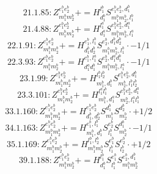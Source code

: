\documentclass[letterpaper,10pt,fleqn,leqno,onecolumn]{article}
\begin{document}
\begin{equation} \;\;\;\;\;\;  21.1.85: Z^{e_{1}^{b}e_{2}^{b}}_{m_{1}^{b}m_{2}^{b}}+=H^{l_{1}^{b}}_{d_{1}^{b}}S^{e_{1}^{b}e_{2}^{b},d_{1}^{b}}_{m_{1}^{b}m_{2}^{b},l_{1}^{b}} \end{equation}
\begin{equation} \;\;\;\;\;\;  21.4.88: Z^{e_{1}^{b}e_{2}^{b}}_{m_{1}^{b}m_{2}^{b}}+=H^{l_{1}^{a}}_{d_{1}^{a}}S^{e_{1}^{b}e_{2}^{b},d_{1}^{a}}_{m_{1}^{b}m_{2}^{b},l_{1}^{a}} \end{equation}
\begin{equation} \;\;\;\;\;\;  22.1.91: Z^{e_{1}^{b}e_{2}^{b}}_{m_{1}^{b}m_{2}^{b}}+=H^{e_{1}^{b},l_{1}^{b}}_{d_{1}^{b}d_{2}^{b}}S^{e_{2}^{b},d_{1}^{b}d_{2}^{b}}_{m_{1}^{b}m_{2}^{b},l_{1}^{b}}\cdot -1/1 \end{equation}
\begin{equation} \;\;\;\;\;\;  22.3.93: Z^{e_{1}^{b}e_{2}^{b}}_{m_{1}^{b}m_{2}^{b}}+=H^{e_{1}^{b},l_{1}^{a}}_{d_{1}^{a}d_{1}^{b}}S^{e_{2}^{b},d_{1}^{a}d_{1}^{b}}_{m_{1}^{b}m_{2}^{b},l_{1}^{a}}\cdot -1/1 \end{equation}
\begin{equation} \;\;\;\;\;\;  23.1.99: Z^{e_{1}^{b}e_{2}^{b}}_{m_{1}^{b}m_{2}^{b}}+=H^{l_{1}^{b}l_{2}^{b}}_{m_{1}^{b},d_{1}^{b}}S^{e_{1}^{b}e_{2}^{b},d_{1}^{b}}_{m_{2}^{b},l_{1}^{b}l_{2}^{b}} \end{equation}
\begin{equation} \;\;\;\;\;\;  23.3.101: Z^{e_{1}^{b}e_{2}^{b}}_{m_{1}^{b}m_{2}^{b}}+=H^{l_{1}^{a}l_{1}^{b}}_{m_{1}^{b},d_{1}^{a}}S^{e_{1}^{b}e_{2}^{b},d_{1}^{a}}_{m_{2}^{b},l_{1}^{a}l_{1}^{b}} \end{equation}
\begin{equation} \;\;\;\;\;\;  33.1.160: Z^{e_{1}^{b}e_{2}^{b}}_{m_{1}^{b}m_{2}^{b}}+=H^{e_{1}^{b}e_{2}^{b}}_{d_{1}^{b},d_{2}^{b}}S^{d_{1}^{b}}_{m_{1}^{b}}S^{d_{2}^{b}}_{m_{2}^{b}}\cdot +1/2 \end{equation}
\begin{equation} \;\;\;\;\;\;  34.1.163: Z^{e_{1}^{b}e_{2}^{b}}_{m_{1}^{b}m_{2}^{b}}+=H^{e_{1}^{b},l_{1}^{b}}_{m_{1}^{b},d_{1}^{b}}S^{e_{2}^{b}}_{l_{1}^{b}}S^{d_{1}^{b}}_{m_{2}^{b}}\cdot -1/1 \end{equation}
\begin{equation} \;\;\;\;\;\;  35.1.169: Z^{e_{1}^{b}e_{2}^{b}}_{m_{1}^{b}m_{2}^{b}}+=H^{l_{1}^{b},l_{2}^{b}}_{m_{1}^{b}m_{2}^{b}}S^{e_{1}^{b}}_{l_{1}^{b}}S^{e_{2}^{b}}_{l_{2}^{b}}\cdot +1/2 \end{equation}
\begin{equation} \;\;\;\;\;\;  39.1.188: Z^{e_{1}^{b}e_{2}^{b}}_{m_{1}^{b}m_{2}^{b}}+=H^{l_{1}^{b}}_{d_{1}^{b}}S^{e_{1}^{b}}_{l_{1}^{b}}S^{e_{2}^{b},d_{1}^{b}}_{m_{1}^{b}m_{2}^{b}} \end{equation}
\end{document}
